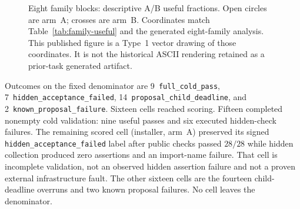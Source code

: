 \documentclass{article}
\begin{document}
\begin{table}[H]
  \caption{Useful completions among two nested repetitions per family and arm.
    Families are the analysis blocks. Generated from the complete 32-cell
    analysis; repetitions are nested, not independent repositories.}
  \label{tab:family-useful}
  \centering
  
\end{table}

\begin{figure}[H]
  \centering
  \caption{Eight family blocks: descriptive A/B useful fractions. Open circles
    are arm~A; crosses are arm~B. Coordinates match Table~\ref{tab:family-useful}
    and the generated eight-family analysis. This published figure is a Type~1
    vector drawing of those coordinates. It is not the historical ASCII
    rendering retained as a prior-task generated artifact.}
  \label{fig:family-useful}
\end{figure}

Outcomes on the fixed denominator are 9~\texttt{full\_cold\_pass},
7~\texttt{hidden\_acceptance\_failed}, 14~\texttt{proposal\_child\_deadline},
and 2~\texttt{known\_proposal\_failure}. Sixteen cells reached scoring.
Fifteen completed nonempty cold validation: nine useful passes and six
executed hidden-check failures. The remaining scored cell (installer, arm~A)
preserved its signed \texttt{hidden\_acceptance\_failed} label after public
checks passed $28/28$ while hidden collection produced zero assertions and an
import-name failure. That cell is incomplete validation, not an observed
hidden assertion failure and not a proven external infrastructure fault.
The other sixteen cells are the fourteen child-deadline overruns and two
known proposal failures. No cell leaves the denominator.
\end{document}
